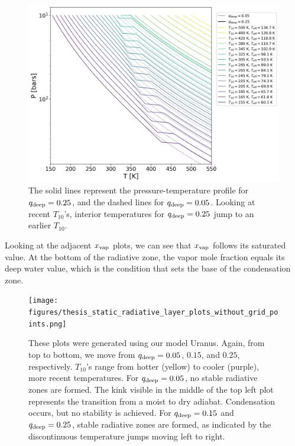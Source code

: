 \documentclass[11pt]{ucscthesisbs}
\begin{document}
{{\begin{figure}[ht]
 \centerline{
  \includegraphics[scale=0.7]{figures/thesis_static_radiative_layer_plot_diff_qdeep_overlay.png}
 }
\caption[Impact of Radiative Layer on T10]
{The solid lines represent the pressure-temperature profile for $q_{\rm deep} = 0.25$, and the dashed lines for $q_{\rm deep}=0.05$. Looking at recent $T_{10}$'s, interior temperatures for $q_{\rm deep} = 0.25$ jump to an earlier $T_{10}$.}
\label{fig:overlay}
\end{figure}

Looking at the adjacent $x_{\rm vap}$ plots, we can see that $x_{\rm vap}$ follows its saturated value. At the bottom of the radiative zone, the vapor mole fraction equals its deep water value, which is the condition that sets the base of the condensation zone. 

\begin{figure}[ht]
 \centerline{
  \texttt{[image: figures/thesis\_static\_radiative\_layer\_plots\_without\_grid\_points.png]}
 }
\caption[Formation of Radiative Zone]
{These plots were generated using our model Uranus. Again, from top to bottom, we move from $q_{\rm deep} = 0.05$, $0.15$, and $0.25$, respectively. $T_{10}$'s range from hotter (yellow) to cooler (purple), more recent temperatures. For $q_{\rm deep} = 0.05$, no stable radiative zones are formed. The kink visible in the middle of the top left plot represents the transition from a moist to dry adiabat. Condensation occurs, but no stability is achieved. For $q_{\rm deep} = 0.15$ and $q_{\rm deep} = 0.25$, stable radiative zones are formed, as indicated by the discontinuous temperature jumps moving left to right.}
\label{fig:radiative}
\end{figure}


}}
\end{document}
